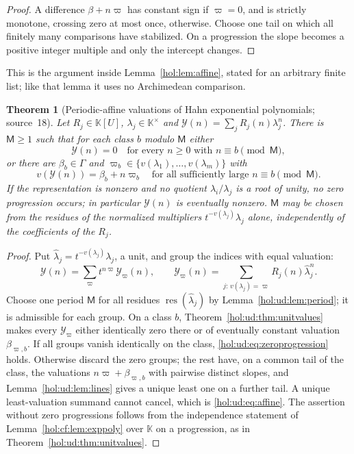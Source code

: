 \documentclass[11pt]{article}
\numberwithin{equation}{section}
\newtheorem{theorem}{Theorem}[section]
\theoremstyle{definition}
\theoremstyle{remark}
\newcommand{\res}{\operatorname{res}}
\newcommand{\KK}{\mathbb K}
\begin{document}
\begin{proof}
A difference $\beta+n\varpi$ has constant sign if $\varpi=0$, and is strictly
monotone, crossing zero at most once, otherwise. Choose one tail on which all
finitely many comparisons have stabilized. On a progression the slope becomes
a positive integer multiple and only the intercept changes.
\end{proof}

This is the argument inside Lemma~\ref{hol:lem:affine}, stated for an
arbitrary finite list; like that lemma it uses no Archimedean comparison.

\begin{theorem}[Periodic-affine valuations of Hahn exponential polynomials;
source~18]\label{hol:ud:thm:affine}
Let $R_j\in\KK[U]$, $\lambda_j\in\KK^\times$ and
$\mathcal Y(n)=\sum_jR_j(n)\lambda_j^n$. There is $\mathsf M\ge1$ such that for
each class $b$ modulo $\mathsf M$ either
\begin{equation}\label{hol:ud:eq:zeroprogression}
 \mathcal Y(n)=0\quad\text{for every }n\ge0\text{ with }n\equiv b
 \pmod{\mathsf M},
\end{equation}
or there are $\beta_b\in\Gamma$ and $\varpi_b\in\{v(\lambda_1),\ldots,
v(\lambda_m)\}$ with
\begin{equation}\label{hol:ud:eq:affine}
 v(\mathcal Y(n))=\beta_b+n\varpi_b\quad\text{for all sufficiently large }
 n\equiv b\pmod{\mathsf M}.
\end{equation}
If the representation is nonzero and no quotient $\lambda_i/\lambda_j$ is a
root of unity, no zero progression occurs; in particular $\mathcal Y(n)$ is
eventually nonzero. $\mathsf M$ may be chosen from the residues of the
normalized multipliers $t^{-v(\lambda_j)}\lambda_j$ alone, independently of the
coefficients of the $R_j$.
\end{theorem}

\begin{proof}
Put $\hat\lambda_j=t^{-v(\lambda_j)}\lambda_j$, a unit, and group the indices
with equal valuation:
\[
 \mathcal Y(n)=\sum_\varpi t^{n\varpi}\mathcal Y_\varpi(n),\qquad
 \mathcal Y_\varpi(n)=\sum_{j:\,v(\lambda_j)=\varpi}R_j(n)\hat\lambda_j^n .
\]
Choose one period $\mathsf M$ for all residues $\res(\hat\lambda_j)$ by
Lemma~\ref{hol:ud:lem:period}; it is admissible for each group. On a class
$b$, Theorem~\ref{hol:ud:thm:unitvalues} makes every $\mathcal Y_\varpi$ either
identically zero there or of eventually constant valuation $\beta_{\varpi,b}$.
If all groups vanish identically on the class,
\eqref{hol:ud:eq:zeroprogression} holds. Otherwise discard the zero groups; the
rest have, on a common tail of the class, the valuations
$n\varpi+\beta_{\varpi,b}$ with pairwise distinct slopes, and
Lemma~\ref{hol:ud:lem:lines} gives a unique least one on a further tail. A
unique least-valuation summand cannot cancel, which is
\eqref{hol:ud:eq:affine}. The assertion without zero progressions follows
from the independence statement of Lemma~\ref{hol:cf:lem:exppoly} over $\KK$
on a progression, as in Theorem~\ref{hol:ud:thm:unitvalues}.
\end{proof}
\end{document}
